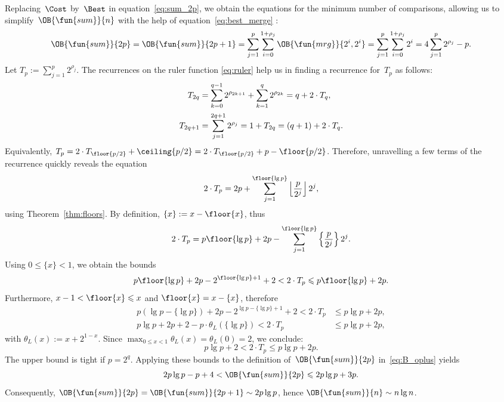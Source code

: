 Replacing~\(\Cost\) by~\(\Best\) in equation~\eqref{eq:sum_2p}, we
obtain the equations for the minimum number of comparisons, allowing
us to simplify~\(\OB{\fun{sum}}{n}\)
with the help of equation~\eqref{eq:best_merge}
:
\begin{equation}
\OB{\fun{sum}}{2p}
  = \OB{\fun{sum}}{2p+1}
  = \sum_{j=1}^{p}\sum_{i=0}^{1+\rho_{j}}{\OB{\fun{mrg}}{2^i,2^i}}
  = \sum_{j=1}^{p}\sum_{i=0}^{1+\rho_{j}}{2^{i}}
  = 4\sum_{j=1}^{p}{2^{\rho_{j}}} - p.
\label{eq:B_oplus}
\end{equation}
Let \(T_p := \sum_{j=1}^{p}{2^{\rho_{j}}}\). The recurrences on the
ruler function \eqref{eq:ruler}
 help us in finding a recurrence for~\(T_p\) as
follows:
\begin{align*}
T_{2q} &= \sum_{k=0}^{\smash[t]{q-1}}{2^{\rho_{2k+1}}} +
\sum_{k=1}^{q}{2^{\rho_{2k}}} = q + 2 \cdot T_{q},\\[2mm]
T_{2q+1}
&= \sum_{j=1}^{\smash[t]{2q+1}}{2^{\rho_{j}}} = 1 + T_{2q} = (q + 1) +
2 \cdot T_{q}.
\end{align*}
Equivalently, \(T_{p} = 2 \cdot T_{\floor{p/2}} + \ceiling{p/2} = 2
\cdot T_{\floor{p/2}} + p - \floor{p/2}\). Therefore, unravelling a
few terms of the recurrence quickly reveals the equation
\begin{equation*}
2 \cdot T_p = 2p + \sum_{j=1}^{\floor{\lg p}}
            {\left\lfloor{\frac{p}{2^j}}\right\rfloor 2^j},
\end{equation*}
using Theorem~\vref{thm:floors}. By definition, \(\{x\} := x -
\floor{x}\), thus
\begin{equation*}
2 \cdot T_p = p\floor{\lg p} + 2p - \sum_{j=1}^{\floor{\lg
    p}}\left\lbrace\frac{p}{2^j}\right\rbrace 2^j.
\end{equation*}
Using \(0 \leqslant \{x\} < 1\), we obtain the bounds
\begin{equation*}
p\floor{\lg p} + 2p - 2^{\floor{\lg p}+1} + 2 < 2 \cdot T_p \leqslant
p\floor{\lg p} + 2p.
\end{equation*}
Furthermore, \(x - 1 < \floor{x} \leqslant x\) and \(\floor{x} = x -
\{x\}\), therefore
\begin{align*}
p(\lg p - \{\lg p\}) + 2p - 2^{\lg p - \{\lg p\} +
  1} + 2 < 2 \cdot T_p &\leqslant p\lg p + 2p,\\
p\lg p + 2p + 2 - p \cdot \theta_L(\{\lg p\}) < 2 \cdot T_p
&\leqslant p\lg p + 2p,
\end{align*}
with \(\theta_L(x) := x + 2^{1 - x}\). Since \(\max_{0 \leqslant x <
  1}\theta_L(x) = \theta_L(0) = 2\), we conclude:
\begin{equation*}
p\lg p + 2 < 2 \cdot T_p \leqslant p\lg p + 2p.
\end{equation*}
The upper bound is tight if \(p=2^q\). Applying these bounds to the
definition of~\(\OB{\fun{sum}}{2p}\) in~\eqref{eq:B_oplus} yields
\begin{equation}
2p\lg p - p + 4 < \OB{\fun{sum}}{2p} \leqslant 2p\lg p + 3p.
\label{ineq:B_oplus_2p}
\end{equation}
Consequently, \(\OB{\fun{sum}}{2p} = \OB{\fun{sum}}{2p+1} \sim 2p\lg
p\), hence \(\OB{\fun{sum}}{n} \sim n\lg n\).

